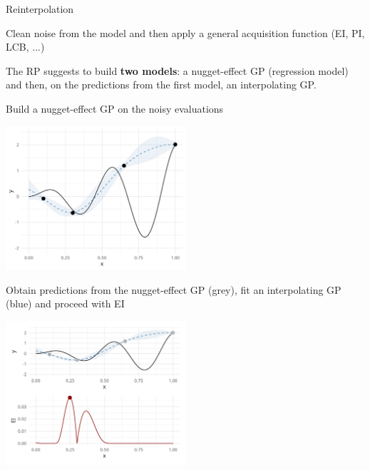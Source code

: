 \documentclass[11pt,compress,t,notes=noshow, xcolor=table]{beamer}
\begin{document}
\begin{vbframe}{Reinterpolation}

Clean noise from the model and then apply a general acquisition function (EI, PI, LCB, ...)

\lz 

The RP suggests to build \textbf{two models}: a nugget-effect GP (regression model) and then, on the predictions from the first model, an interpolating GP.

\begin{algorithm}[H]
\footnotesize
  \caption{Reinterpolation Procedure}
  \begin{algorithmic}[1]
  \end{algorithmic}
\end{algorithm}

\framebreak

Build a nugget-effect GP on the noisy evaluations

\vspace*{0.5cm}

\begin{center}
  \includegraphics[width = 0.5\textwidth]{figure_man/noisy_2.png}
\end{center}

\framebreak

Obtain predictions from the nugget-effect GP (grey), fit an interpolating GP (blue) and proceed with EI

\vspace*{0.5cm}

\begin{center}
  \includegraphics[width = 0.5\textwidth]{figure_man/noisy_4.png}
\end{center}

\end{vbframe}
\end{document}
